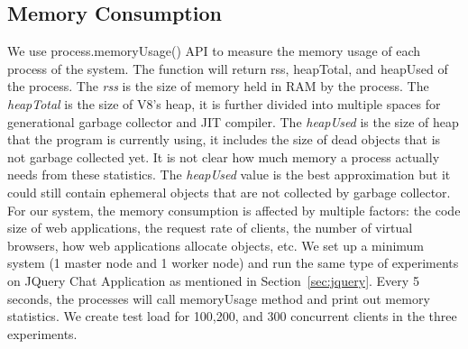 \subsection{Memory Consumption}
We use \nodejs{} process.memoryUsage() API to measure the memory usage of each process
of the system.
The function will return rss, heapTotal, and heapUsed of the process.
The \emph{rss} is the size of memory held in RAM by the process.
The \emph{heapTotal} is the size of V8's heap, it is further divided into 
multiple spaces for generational garbage collector and JIT compiler.
The \emph{heapUsed} is the size of heap that the program is currently using,
it includes the size of dead objects that is not garbage collected yet.
It is not clear how much memory a \nodejs{} process actually needs from these statistics.
The \emph{heapUsed} value is the best approximation but it could still contain
ephemeral objects that are not collected by garbage collector.
For our system, the memory consumption is affected by multiple factors:
the code size of web applications, the request rate of clients, 
the number of virtual browsers, how web applications allocate objects, etc.
We set up a minimum \cb{} system (1 master node and 1 worker node)
and run the same type of experiments on JQuery Chat Application as mentioned in Section~\ref{sec:jquery}.
Every 5 seconds, the \cb{} processes will call memoryUsage method and print out
memory statistics.
We create test load for 100,200, and 300 concurrent clients in the three experiments.

\memfig{}

